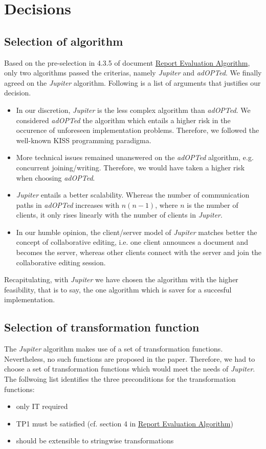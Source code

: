 \section{Decisions}
\subsection{Selection of algorithm}
Based on the pre-selection in 4.3.5 of document \href{http://ace.iserver.ch:81/repos/ace/ace/trunk/doc/pdf/algorithm.pdf}{Report Evaluation Algorithm}, only two algorithms passed the criterias, namely \emph{Jupiter} and \emph{adOPTed}. We finally agreed on the \emph{Jupiter} algorithm. Following is a list of arguments that justifies our decision.

\begin{itemize}
 \item In our discretion, \emph{Jupiter} is the less complex algorithm than \emph{adOPTed}. We considered \emph{adOPTed} the algorithm which entails a higher risk in the occurence of unforeseen implementation problems. Therefore, we followed the well-known KISS programming paradigma.
 \item More technical issues remained unanswered on the \emph{adOPTed} algorithm, e.g. concurrent joining/writing. Therefore, we would have taken a higher risk when choosing \emph{adOPTed}.
 \item \emph{Jupiter} entails a better scalability. Whereas the number of communication paths in \emph{adOPTed} increases with $n(n-1)$, where $n$ is the number of clients, it only rises linearly with the number of clients in \emph{Jupiter}.
 \item In our humble opinion, the client/server model of \emph{Jupiter} matches better the concept of collaborative editing, i.e. one client announces a document and becomes the server, whereas other clients connect with the server and join the collaborative editing session.
\end{itemize}

Recapitulating, with \emph{Jupiter} we have chosen the algorithm with the higher feasibility, that is to say, the one algorithm which is saver for a succesful implementation.

\subsection{Selection of transformation function}
The \emph{Jupiter} algorithm makes use of a set of transformation functions. Nevertheless, no such functions are proposed in the paper. Therefore, we had to choose a set of transformation functions which would meet the needs of \emph{Jupiter}. The follwoing list identifies the three preconditions for the transformation functions:
\begin{itemize}
 \item only IT required
 \item TP1 must be satisfied (cf. section 4 in \href{http://ace.iserver.ch:81/repos/ace/ace/trunk/doc/pdf/algorithm.pdf}{Report Evaluation Algorithm})
 \item should be extensible to stringwise transformations
\end{itemize}

